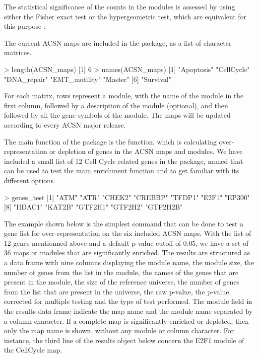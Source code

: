 The statistical significance of the counts in the modules is assessed by using
either the Fisher exact test \citep{fisher1922interpretation,
fisher1934statistical} or the hypergeometric test, which are equivalent for this
purpose \citep{rivals2007enrichment}.

The current ACSN maps are included in the  package, as a list of character matrices.

\begin{example}
> length(ACSN_maps)
[1] 6
> names(ACSN_maps)
[1] "Apoptosis"    "CellCycle"    "DNA_repair"   "EMT_motility" "Master" 
[6] "Survival"    
\end{example}

For each matrix, rows represent a module, with the name of the module in the
first column, followed by a description of the module (optional), and then
followed by all the gene symbols of the module. The maps will be updated
according to every ACSN major release.

The main function of the  package is the 
function, which is calculating over-representation or depletion of genes in the
ACSN maps and modules. We have included a small list of 12 Cell Cycle related
genes in the package, named  that can be used to test the main
enrichment function and to get familiar with its different options.

\begin{example}
> genes_test
 [1] "ATM"     "ATR"     "CHEK2"   "CREBBP"  "TFDP1"   "E2F1"    "EP300"  
 [8] "HDAC1"   "KAT2B"   "GTF2H1"  "GTF2H2"  "GTF2H2B"
\end{example}

The example shown below is the simplest command that can be done to test a gene
list for over-representation on the six included ACSN maps. With the list of 12
genes mentionned above and a default p-value cutoff of $0.05$, we have a set of
36 maps or modules that are significantly enriched. The results are structured
as a data frame with nine columns displaying the module name, the module size,
the number of genes from the list in the module, the names of the genes that are
present in the module, the size of the reference universe, the number of genes
from the list that are present in the universe, the raw p-value, the p-value
corrected for multiple testing and the type of test performed. The module field
in the results data frame indicate the map name and the module name separated by
a column character. If a complete map is significantly enriched or depleted,
then only the map name is shown, without any module or column character. For
instance, the third line of the results object below concern the E2F1 module of
the CellCycle map. 


